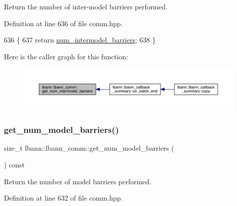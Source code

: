 Return the number of inter-\/model barriers performed. 

Definition at line 636 of file comm.\+hpp.


\begin{DoxyCode}
636                                                     \{
637     \textcolor{keywordflow}{return} \hyperlink{classlbann_1_1lbann__comm_a03d946ef5ea5d3b15351e78a2eed10fe}{num\_intermodel\_barriers};
638   \}
\end{DoxyCode}
Here is the caller graph for this function\+:\nopagebreak
\begin{figure}[H]
\begin{center}
\leavevmode
\includegraphics[width=350pt]{classlbann_1_1lbann__comm_a78ea2f289eb8de66edecb84b6cf48b84_icgraph}
\end{center}
\end{figure}
\mbox{\label{classlbann_1_1lbann__comm_ab07201c12c01f065acb151f2a3c32efa}} 
\subsubsection{\texorpdfstring{get\+\_\+num\+\_\+model\+\_\+barriers()}{get\_num\_model\_barriers()}}
{\footnotesize\ttfamily size\+\_\+t lbann\+::lbann\+\_\+comm\+::get\+\_\+num\+\_\+model\+\_\+barriers (\begin{DoxyParamCaption}{ }\end{DoxyParamCaption}) const\hspace{0.3cm}{\ttfamily [inline]}}

Return the number of model barriers performed. 

Definition at line 632 of file comm.\+hpp.


